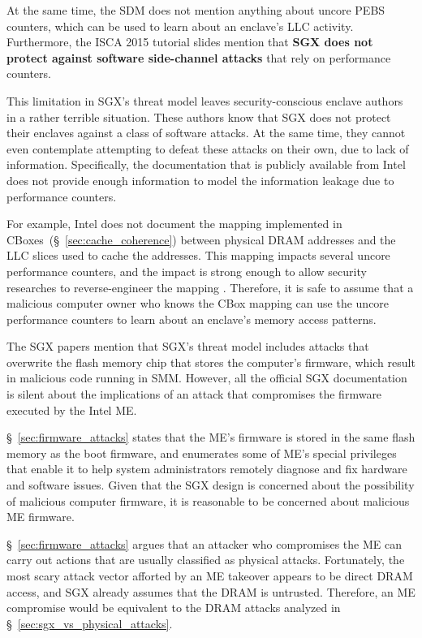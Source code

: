 At the same time, the SDM does not mention anything about uncore PEBS counters,
which can be used to learn about an enclave's LLC activity. Furthermore, the
ISCA 2015 tutorial slides mention that \textbf{SGX does not protect against
software side-channel attacks} that rely on performance counters.

This limitation in SGX's threat model leaves security-conscious enclave authors
in a rather terrible situation. These authors know that SGX does not protect
their enclaves against a class of software attacks. At the same time, they
cannot even contemplate attempting to defeat these attacks on their own, due to
lack of information. Specifically, the documentation that is publicly available
from Intel does not provide enough information to model the information leakage
due to performance counters.

For example, Intel does not document the mapping implemented in
CBoxes~(\S~\ref{sec:cache_coherence}) between physical DRAM addresses and the
LLC slices used to cache the addresses. This mapping impacts several uncore
performance counters, and the impact is strong enough to allow security
researches to reverse-engineer the mapping \cite{inci2015rsachannel,
maurice2015intelhash, yarom2015intelhash}. Therefore, it is safe to assume that
a malicious computer owner who knows the CBox mapping can use the uncore
performance counters to learn about an enclave's memory access patterns.

The SGX papers mention that SGX's threat model includes attacks that overwrite
the flash memory chip that stores the computer's firmware, which result in
malicious code running in SMM.  However, all the official SGX documentation is
silent about the implications of an attack that compromises the firmware
executed by the Intel ME.

\S~\ref{sec:firmware_attacks} states that the ME's firmware is stored in the
same flash memory as the boot firmware, and enumerates some of ME's special
privileges that enable it to help system administrators remotely diagnose and
fix hardware and software issues. Given that the SGX design is concerned about
the possibility of malicious computer firmware, it is reasonable to be
concerned about malicious ME firmware.

\S~\ref{sec:firmware_attacks} argues that an attacker who compromises the ME
can carry out actions that are usually classified as physical attacks.
Fortunately, the most scary attack vector afforted by an ME takeover appears to
be direct DRAM access, and SGX already assumes that the DRAM is untrusted.
Therefore, an ME compromise would be equivalent to the DRAM attacks analyzed in
\S~\ref{sec:sgx_vs_physical_attacks}.


